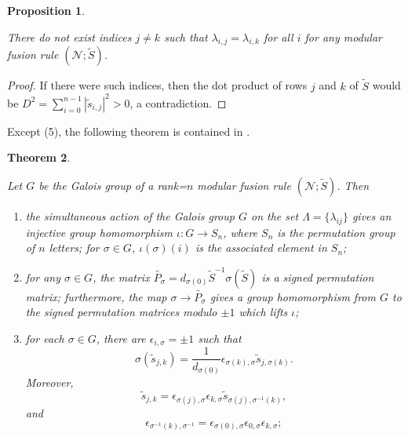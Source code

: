 \documentclass[12pt,psamsfonts]{amsart}
\newcommand{\e}{{\epsilon}}
\newcommand{\mN}{\mathcal{N}}
\newcommand{\tS}{\tilde{S}}
\newcommand{\ts}{\tilde{s}}
\numberwithin{equation}{section}
\newtheorem{theorem}{Theorem}[section]
\newtheorem{prop}[theorem]{Proposition}
\theoremstyle{definition}
\begin{document}
\begin{prop}\label{determinelabel}

There do not exist indices $j\ne k$ such that
$\lambda_{i,j}=\lambda_{i,k}$ for all $i$ for any modular fusion
rule $(\mN;\tS)$.

\end{prop}

\begin{proof}

If there were such indices, then the dot product of rows $j$ and
$k$ of $\tilde S$ would be $D^2=\sum_{i=0}^{n-1} |\ts_{i,j}|^2
>0$, a contradiction.

\end{proof}

Except (5), the following theorem is contained in \cite{CG}.

\begin{theorem}\label{Galoissymmetry}

Let $G$ be the Galois group of a rank=$n$ modular fusion rule $(\mN;\tS)$.
Then

\begin{enumerate}

\item the simultaneous action of the Galois group $G$ on the set
$\Lambda=\{\lambda_{ij}\}$ gives an injective group homomorphism
$\iota: G\rightarrow S_n$, where $S_n$ is the permutation group of
$n$ letters; for $\sigma \in G$, $\iota(\sigma)(i)$ is the
associated element in $S_n$;

\item for any $\sigma \in G$, the matrix
$\tilde{P_{\sigma}}=d_{\sigma(0)}\tS^{-1}\sigma(\tS)$ is a signed
permutation matrix; furthermore, the map $\sigma\rightarrow
\tilde{P_{\sigma}}$ gives a group homomorphism from $G$ to the
signed permutation matrices modulo $\pm 1$ which lifts $\iota$;

\item for each $\sigma \in G$, there are $\e_{i,\sigma}=\pm 1$
such that
\begin{equation}\label{actionidentity1}
\sigma(\tilde{s}_{j,k})=\frac{1}{d_{\sigma(0)}}\e_{\sigma(k),\sigma}\tilde{s}_{j,\sigma(k)}.
\end{equation}
Moreover,
\begin{equation}\label{actionidentity}
\tilde{s}_{j,k}=\e_{\sigma(j),\sigma}\e_{k,\sigma}\tilde{s}_{\sigma(j),\sigma^{-1}(k)},
\end{equation}
and
\begin{equation}\label{inverse}
\e_{\sigma^{-1}(k),\sigma^{-1}}=\e_{\sigma(0),\sigma}\e_{0,\sigma}\e_{k,\sigma};
\end{equation}


\end{enumerate}
\end{theorem}
\end{document}
